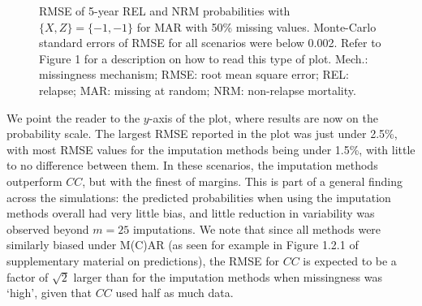 \documentclass[
  letterpaper,
  paper=240mm:170mm,
  twoside=true,
  open=right,
  fontsize=10pt,
  pagesize=false,
  BCOR=15mm,
  DIV=14,
  headinclude=true,
  footinclude=false,
  headsepline=on]{scrbook}
\begin{document}
\begin{figure}


\caption{\label{fig-five-year-MAR}RMSE of 5-year REL and NRM
probabilities with \(\{X, Z\} = \{-1, -1\}\) for MAR with 50\% missing
values. Monte-Carlo standard errors of RMSE for all scenarios were below
0.002. Refer to Figure 1 for a description on how to read this type of
plot. Mech.: missingness mechanism; RMSE: root mean square error; REL:
relapse; MAR: missing at random; NRM: non-relapse mortality.}

\end{figure}%

We point the reader to the \(y\)-axis of the plot, where results are now
on the probability scale. The largest RMSE reported in the plot was just
under 2.5\%, with most RMSE values for the imputation methods being
under 1.5\%, with little to no difference between them. In these
scenarios, the imputation methods outperform \(CC\), but with the finest
of margins. This is part of a general finding across the simulations:
the predicted probabilities when using the imputation methods overall
had very little bias, and little reduction in variability was observed
beyond \(m = 25\) imputations. We note that since all methods were
similarly biased under M(C)AR (as seen for example in Figure 1.2.1 of
supplementary material on predictions), the RMSE for \(CC\) is expected
to be a factor of \(\sqrt{2}\) larger than for the imputation methods
when missingness was `high', given that \(CC\) used half as much data.
\end{document}
